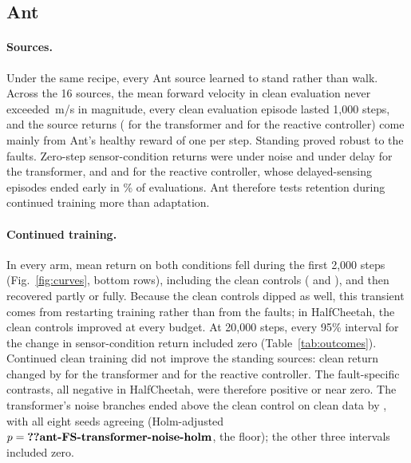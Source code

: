 

\subsection{Ant}
\paragraph{Sources.} Under the same recipe, every Ant source learned to stand rather than walk. Across the 16 sources, the mean forward velocity in clean evaluation never exceeded \,m/s in magnitude, every clean evaluation episode lasted 1,000 steps, and the source returns ( for the transformer and  for the reactive controller) come mainly from Ant's healthy reward of one per step. Standing proved robust to the faults. Zero-step sensor-condition returns were  under noise and  under delay for the transformer, and  and  for the reactive controller, whose delayed-sensing episodes ended early in \% of evaluations. Ant therefore tests retention during continued training more than adaptation.

\paragraph{Continued training.} In every arm, mean return on both conditions fell during the first 2,000 steps (Fig.~\ref{fig:curves}, bottom rows), including the clean controls ( and ), and then recovered partly or fully. Because the clean controls dipped as well, this transient comes from restarting training rather than from the faults; in HalfCheetah, the clean controls improved at every budget. At 20,000 steps, every 95\% interval for the change in sensor-condition return included zero (Table~\ref{tab:outcomes}). Continued clean training did not improve the standing sources: clean return changed by   for the transformer and   for the reactive controller. The fault-specific contrasts, all negative in HalfCheetah, were therefore positive or near zero. The transformer's noise branches ended above the clean control on clean data by  , with all eight seeds agreeing (Holm-adjusted $p=\R{ant-FS-transformer-noise-holm}$, the floor); the other three intervals included zero.

